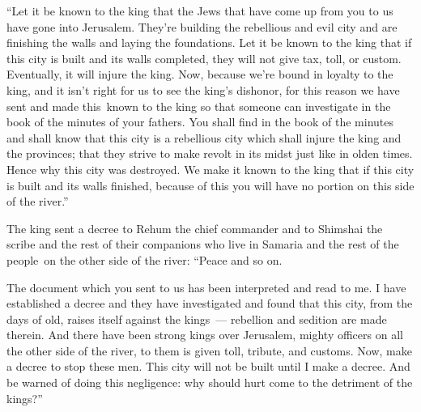 \begin{inparaenum}
     ``Let it be known to the king that the Jews that have come up from you to us have gone into Jerusalem. They're building the rebellious and evil city and are finishing the walls and laying the foundations.%
     Let it be known to the king that if this city is built and its walls completed, they will not give tax, toll, or custom. Eventually, it will injure the king.%
     Now, because we're bound in loyalty to the king, and it isn't right for us to see the king's dishonor, for this reason we have sent and made this\understood\ known to the king%
     so that someone can investigate in the book of the minutes of your fathers. You shall find in the book of the minutes and shall know that this city is a rebellious city which\understood{} shall injure the king and the provinces; that they strive to make revolt in its midst just like in olden times. Hence why this city was destroyed.%
     We make it known to the king that if this city is built and its walls finished, because of this you will have no portion on this side of the river.''%
    
     The king sent a decree to Rehum the chief commander and to Shimshai the scribe and the rest of their companions who live in Samaria and the rest of the people\understood\ on the other side of the river: ``Peace and so on.%
    
     The document which you sent to us has been interpreted and read to me.%
     I have established a decree and they have investigated and found that this city, from the days of old, raises itself against the kings~--- rebellion and sedition are made therein.%
     And there have been strong kings over Jerusalem, mighty officers on all the other side of the river, to them is given toll, tribute, and customs.%
     Now, make a decree to stop these men. This city will not be built until I make a decree.%
     And be warned of doing this negligence: why should hurt come to the detriment of the kings?''%
    

\end{inparaenum}
